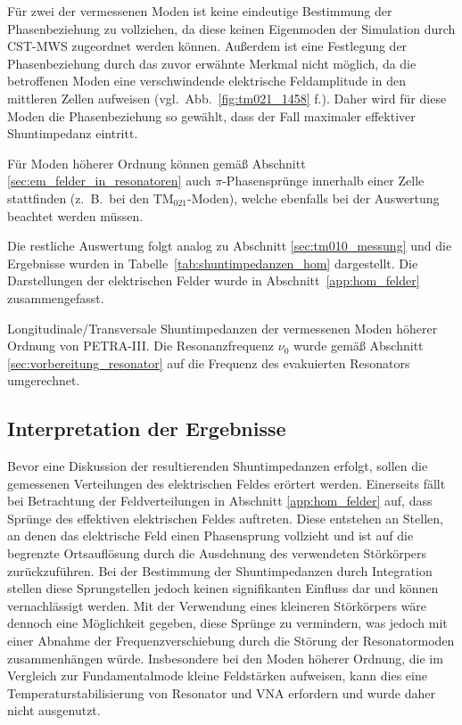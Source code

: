 Für zwei der vermessenen Moden ist keine eindeutige Bestimmung der Phasenbeziehung zu vollziehen, da diese keinen Eigenmoden der Simulation durch CST-MWS zugeordnet werden können.
Außerdem ist eine Festlegung der Phasenbeziehung durch das zuvor erwähnte Merkmal nicht möglich, da die betroffenen Moden eine verschwindende elektrische Feldamplitude in den mittleren Zellen aufweisen (vgl.\ Abb.\ \ref{fig:tm021_1458} f.).
Daher wird für diese Moden die Phasenbeziehung so gewählt, dass der Fall maximaler effektiver Shuntimpedanz eintritt.

Für Moden höherer Ordnung können gemäß Abschnitt \ref{sec:em_felder_in_resonatoren} auch $\pi$-Phasensprünge innerhalb einer Zelle stattfinden (z.\ B.\ bei den $\mathrm{TM}_{021}$-Moden), welche ebenfalls bei der Auswertung beachtet werden müssen.

Die restliche Auswertung folgt analog zu Abschnitt \ref{sec:tm010_messung} und die Ergebnisse wurden in Tabelle~\ref{tab:shuntimpedanzen_hom} dargestellt.
Die Darstellungen der elektrischen Felder wurde in Abschnitt~\ref{app:hom_felder} zusammengefasst.
\begin{table}[htb]
	\centering
	
	\caption[Longitudinale/Transversale Shuntimpedanzen der Moden höherer Ordnung von PETRA-III]{Longitudinale/Transversale Shuntimpedanzen der vermessenen Moden höherer Ordnung von PETRA-III. Die Resonanzfrequenz $\nu_0$ wurde gemäß Abschnitt \ref{sec:vorbereitung_resonator} auf die Frequenz des evakuierten Resonators umgerechnet.}
	\label{tab:shuntimpedanzen_hom}
\end{table}


\subsection{Interpretation der Ergebnisse}
Bevor eine Diskussion der resultierenden Shuntimpedanzen erfolgt, sollen die gemessenen Verteilungen des elektrischen Feldes erörtert werden.
Einerseits fällt bei Betrachtung der Feldverteilungen in Abschnitt \ref{app:hom_felder} auf, dass Sprünge des effektiven elektrischen Feldes auftreten.
Diese entstehen an Stellen, an denen das elektrische Feld einen Phasensprung vollzieht und ist auf die begrenzte Ortsauflösung durch die Ausdehnung des verwendeten Störkörpers zurückzuführen.
Bei der Bestimmung der Shuntimpedanzen durch Integration stellen diese Sprungstellen jedoch keinen signifikanten Einfluss dar und können vernachlässigt werden.
Mit der Verwendung eines kleineren Störkörpers wäre dennoch eine Möglichkeit gegeben, diese Sprünge zu vermindern, was jedoch mit einer Abnahme der Frequenzverschiebung durch die Störung der Resonatormoden zusammenhängen würde.
Insbesondere bei den Moden höherer Ordnung, die im Vergleich zur Fundamentalmode kleine Feldstärken aufweisen, kann dies eine Temperaturstabilisierung von Resonator und VNA erfordern und wurde daher nicht ausgenutzt.

